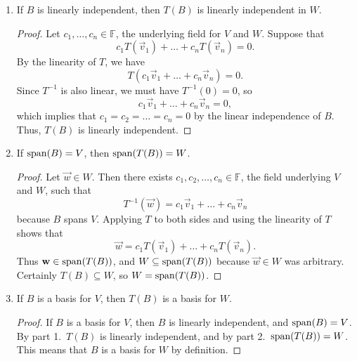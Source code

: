 \documentclass{homework}
\begin{document}
	\begin{enumerate}
		\item If $B$ is linearly independent, then $T(B)$ is linearly independent in $W$.
		\begin{proof}
			Let $c_1, \dots, c_n \in \mathbb{F}$, the underlying field for $V$ and $W$. Suppose that
			\begin{equation*}
				c_1T(\vec{v}_1) + \dots + c_nT(\vec{v}_n) = 0.
			\end{equation*}
			By the linearity of $T$, we have
			\begin{equation*}
				T(c_1\vec{v}_1 + \dots + c_n\vec{v}_n) = 0.
			\end{equation*}
			Since $T^{-1}$ is also linear, we must have $T^{-1}(0) = 0$, so
			\begin{equation*}
				c_1\vec{v}_1 + \dots + c_n\vec{v}_n = 0,
			\end{equation*}
			which implies that $c_1 = c_2 = \dots = c_n = 0$ by the linear independence of $B$. Thus, $T(B)$ is linearly independent.
		\end{proof}
		
		\item If $\mathrm{span}(B) = V$, then $\mathrm{span}(T(B)) = W$.
		\begin{proof}
			Let $\vec{w} \in W$. Then there exists $c_1, c_2, \dots, c_n \in \mathbb{F}$, the field underlying $V$ and $W$, such that
			\begin{equation*}
				T^{-1}(\vec{w}) = c_1\vec{v}_1 + \dots + c_n \vec{v}_n
			\end{equation*}
			because $B$ spans $V$. Applying $T$ to both sides and using the linearity of $T$ shows that
			\begin{equation*}
				\vec{w} = c_1T(\vec{v}_1) + \dots + c_nT(\vec{v}_n).
			\end{equation*}
			Thus $\mathbf{w} \in \mathrm{span}(T(B))$, and $W \subseteq\mathrm{span}(T(B))$ because $\vec{w} \in W$ was arbitrary. Certainly $T(B) \subseteq W$, so $W = \mathrm{span}(T(B))$.
		\end{proof}
		
		\item If $B$ is a basis for $V$, then $T(B)$ is a basis for $W$.
		\begin{proof}
			If $B$ is a basis for $V$, then $B$ is linearly independent, and $\mathrm{span}(B) = V$. By part 1.\ $T(B)$ is linearly independent, and by part 2.\ $\mathrm{span}(T(B)) = W$. This means that $B$ is a basis for $W$ by definition.
		\end{proof}
	\end{enumerate}
	
\end{document}
